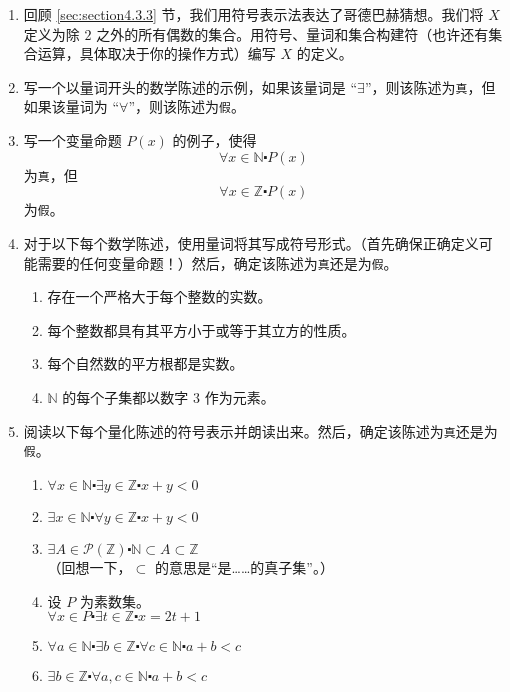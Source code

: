 \begin{enumerate}[label=(\arabic*)]
    \item 回顾 \ref{sec:section4.3.3} 节，我们用符号表示法表达了哥德巴赫猜想。我们将 $X$ 定义为除 $2$ 之外的所有偶数的集合。用符号、量词和集合构建符（也许还有集合运算，具体取决于你的操作方式）编写 $X$ 的定义。
    \item 写一个以量词开头的数学陈述的示例，如果该量词是 ``$\exists$''，则该陈述为\verb|真|，但如果该量词为  ``$\forall$''，则该陈述为\verb|假|。
    \item 写一个变量命题 $P(x)$ 的例子，使得
        \[\forall x \in \mathbb{N} \centerdot P(x)\]
        为\verb|真|，但
        \[\forall x \in \mathbb{Z} \centerdot P(x)\]
        为\verb|假|。
    \item 对于以下每个数学陈述，使用量词将其写成符号形式。（首先确保正确定义可能需要的任何变量命题！）然后，确定该陈述为\verb|真|还是为\verb|假|。
        \begin{enumerate}[label=(\alph*)]
            \item 存在一个严格大于每个整数的实数。
            \item 每个整数都具有其平方小于或等于其立方的性质。
            \item 每个自然数的平方根都是实数。
            \item $\mathbb{N}$ 的每个子集都以数字 $3$ 作为元素。
        \end{enumerate} 
    \item 阅读以下每个量化陈述的符号表示并朗读出来。然后，确定该陈述为\verb|真|还是为\verb|假|。
        \begin{enumerate}[label=(\alph*)]
            \item $\forall x \in \mathbb{N} \centerdot \exists y \in \mathbb{Z} \centerdot x + y < 0$
            \item $\exists x \in \mathbb{N} \centerdot \forall y \in \mathbb{Z} \centerdot x + y < 0$
            \item $\exists A \in \mathcal{P}(\mathbb{Z}) \centerdot \mathbb{N} \subset A \subset \mathbb{Z}$\\（回想一下，$⊂$ 的意思是``是……的真子集''。）
            \item 设 $P$ 为素数集。\\
                    $\forall x \in P \centerdot \exists t \in \mathbb{Z} \centerdot x = 2t + 1$
            \item $\forall a \in \mathbb{N} \centerdot \exists b \in \mathbb{Z} \centerdot \forall c \in \mathbb{N} \centerdot a + b < c$
            \item $\exists b \in \mathbb{Z} \centerdot \forall a, c \in \mathbb{N} \centerdot a + b < c$
        \end{enumerate} 
\end{enumerate}   